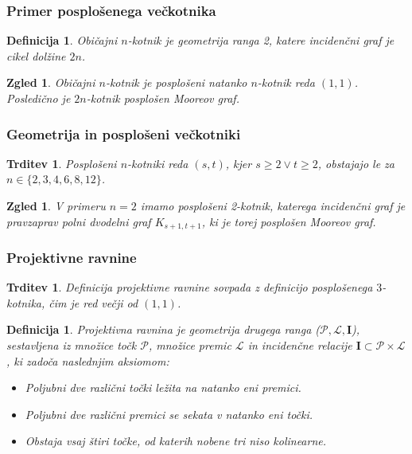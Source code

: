 \documentclass{beamer}
\newtheorem{trditev}[izrek]{Trditev}
\newtheorem{definicija}[izrek]{Definicija}
\newtheorem{zgled}[izrek]{Zgled}
\newcommand{\II}{\mathbf{I}}
\newcommand{\PP}{\mathcal{P}}
\newcommand{\LL}{\mathcal{L}}
\begin{document}
\begin{frame}
    \frametitle{Primer posplošenega večkotnika}
    \begin{definicija}
        Običajni $n$-kotnik je geometrija ranga 2, katere incidenčni graf je cikel 
        dolžine $2n$.
    \end{definicija}
    \begin{zgled}
        Običajni $n$-kotnik je posplošeni natanko $n$-kotnik reda $(1, 1)$. Posledično
        je $2n$-kotnik posplošen Mooreov graf.
    \end{zgled}
\end{frame}

\begin{frame}
    \frametitle{Geometrija in posplošeni večkotniki} 
    \begin{trditev}
    Posplošeni $n$-kotniki reda $(s, t)$, kjer $s\geq2 \lor t\geq2$, obstajajo le za 
    $n \in \{2, 3, 4, 6, 8, 12\}$.
    \end{trditev}
    \begin{zgled}
        V primeru $n=2$ imamo posplošeni 2-kotnik, katerega incidenčni graf je pravzaprav polni
        dvodelni graf $K_{s+1, t+1}$, ki je torej posplošen Mooreov graf.
    \end{zgled}
\end{frame}

\begin{frame}
    \frametitle{Projektivne ravnine}
    \begin{trditev}
        Definicija projektivne ravnine sovpada z definicijo posplošenega $3$-kotnika, čim je red
        večji od $(1,1)$.
    \end{trditev}
    \begin{definicija}
        Projektivna ravnina je geometrija drugega ranga ($\PP, \LL, \II$), sestavljena iz 
        množice točk $\PP$, množice premic $\LL$ in incidenčne relacije $\II \subset \PP \times \LL$,
        ki zadoča naslednjim aksiomom:
        \begin{itemize}
            \item[\textbullet] Poljubni dve različni točki ležita na natanko eni premici.
            \item[\textbullet] Poljubni dve različni premici se sekata v natanko eni točki.
            \item[\textbullet] Obstaja vsaj štiri točke, od katerih nobene tri niso kolinearne.
        \end{itemize}
    \end{definicija}
\end{frame}
\end{document}
